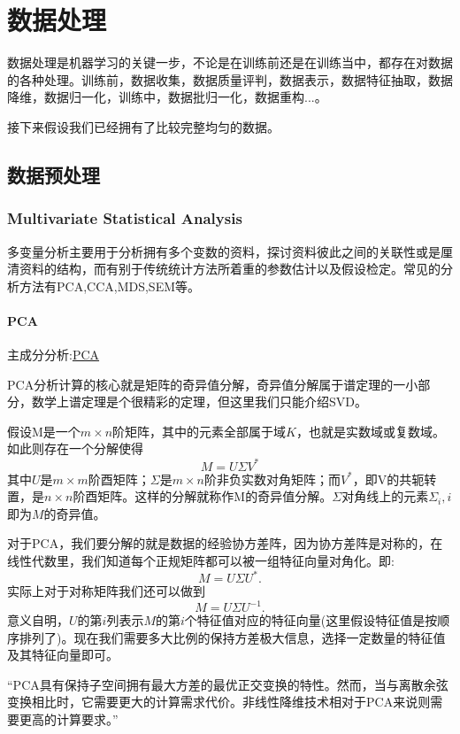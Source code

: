 \chapter{数据处理}
\label{sec:dataprocessing}
数据处理是机器学习的关键一步，不论是在训练前还是在训练当中，都存在对数据的各种处理。训练前，数据收集，数据质量评判，数据表示，数据特征抽取，数据降维，数据归一化，训练中，数据批归一化，数据重构...。

接下来假设我们已经拥有了比较完整均匀的数据。

\section*{数据预处理}
\label{sec:Dimensionlityreduction}

\subsection*{Multivariate Statistical Analysis}
\label{sub:MSA}
多变量分析主要用于分析拥有多个变数的资料，探讨资料彼此之间的关联性或是厘清资料的结构，而有别于传统统计方法所着重的参数估计以及假设检定。常见的分析方法有PCA,CCA,MDS,SEM等。
  \subsubsection*{PCA}
  \label{subsec:PCA}
  主成分分析:\href{https://en.wikipedia.org/wiki/Principal_component_analysis}{PCA}

  PCA分析计算的核心就是矩阵的奇异值分解，奇异值分解属于谱定理的一小部分，数学上谱定理是个很精彩的定理，但这里我们只能介绍SVD。

假设M是一个$m×n$阶矩阵，其中的元素全部属于域$K$，也就是实数域或复数域。如此则存在一个分解使得
$$M=U\Sigma V^{*}$$
其中$U$是$m×m$阶酉矩阵；$Σ$是$m×n$阶非负实数对角矩阵；而$V^*$，即V的共轭转置，是$n×n$阶酉矩阵。这样的分解就称作M的奇异值分解。$\Sigma$对角线上的元素$\Sigma_i,i$即为$M$的奇异值。

对于PCA，我们要分解的就是数据的经验协方差阵，因为协方差阵是对称的，在线性代数里，我们知道每个正规矩阵都可以被一组特征向量对角化。即:$$M=U \Sigma U^*.$$实际上对于对称矩阵我们还可以做到$$M=U \Sigma U^{-1}.$$
意义自明，$U$的第$i$列表示$M$的第$i$个特征值对应的特征向量(这里假设特征值是按顺序排列了)。现在我们需要多大比例的保持方差极大信息，选择一定数量的特征值及其特征向量即可。

“PCA具有保持子空间拥有最大方差的最优正交变换的特性。然而，当与离散余弦变换相比时，它需要更大的计算需求代价。非线性降维技术相对于PCA来说则需要更高的计算要求。”

